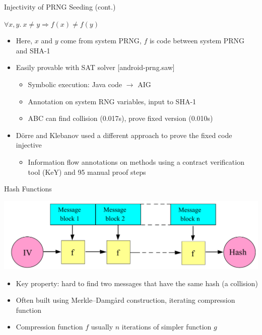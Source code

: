 \documentclass[ignorenonframetext,]{beamer}
\providecommand{\tightlist}{%
  \setlength{\itemsep}{0pt}\setlength{\parskip}{0pt}}
\newcommand{\infile}[1]{{\tiny \alert{[#1]}}}
\begin{document}
\begin{frame}{Injectivity of PRNG Seeding (cont.)}

\begin{center}
$\forall x, y.~x \neq y \Rightarrow f(x) \neq f(y)$
\end{center}

\begin{itemize}
\tightlist
\item
  Here, \(x\) and \(y\) come from system PRNG, \(f\) is code between
  system PRNG and SHA-1
\item
  Easily provable with SAT solver \infile{android-prng.saw}

  \begin{itemize}
  \tightlist
  \item
    Symbolic execution: Java code \(\rightarrow\) AIG
  \item
    Annotation on system RNG variables, input to SHA-1
  \item
    ABC can find collision (0.017s), prove fixed version (0.010s)
  \end{itemize}
\item Dörre and Klebanov used a different approach to prove the fixed code
  injective \cite{dorre2015prng}

  \begin{itemize}
  \tightlist
  \item
    Information flow annotations on methods using a contract
    verification tool (KeY) and 95 manual proof steps
  \end{itemize}
\end{itemize}

\end{frame}

\begin{frame}{Hash Functions}

\begin{center}
\includegraphics[width=\textwidth]{images/Merkle-damgard.pdf}
\end{center}

\begin{itemize}
\tightlist
\item
  Key property: hard to find two messages that have the same hash (a
  \alert{collision})
\item
  Often built using Merkle--Damgård construction, iterating compression
  function
\item
  Compression function \(f\) usually \(n\) iterations of simpler
  function \(g\)
\end{itemize}

\end{frame}
\end{document}
